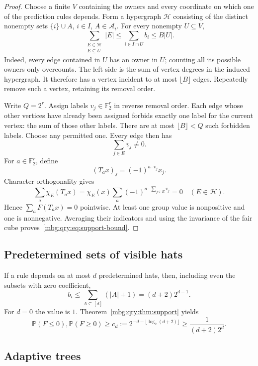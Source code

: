 \documentclass[11pt,letterpaper]{article}
\theoremstyle{definition}
\newcommand{\E}{\mathbb E}
\newcommand{\Prb}{\mathbb P}
\newcommand{\F}{\mathbb F}
\begin{document}
\begin{proof}
Choose a finite \(V\) containing the owners and every coordinate on
which one of the prediction rules depends. Form a
hypergraph \(\mathcal H\) consisting of the distinct nonempty sets
\(\{i\}\cup A\), \(i\in I\), \(A\in\mathcal A_i\).
For every nonempty \(U\subseteq V\),
\begin{equation}
 \sum_{\substack{E\in\mathcal H\\E\subseteq U}}|E|
 \le \sum_{i\in I\cap U}b_i\le B|U|.
 \label{mbg:qry:eq:incidence}
\end{equation}
Indeed, every edge contained in \(U\) has an owner in \(U\);
counting all its possible owners only overcounts.
The left side is the sum of vertex degrees in the induced hypergraph.
It therefore has a vertex incident to at most \(\lfloor B\rfloor\)
edges. Repeatedly remove such a vertex, retaining its removal order.

Write \(Q=2^r\). Assign labels \(v_j\in\F_2^r\) in reverse removal
order. Each edge whose other vertices have already been assigned
forbids exactly one label for the current vertex: the sum of those
other labels. There are at most \(\lfloor B\rfloor<Q\) such forbidden
labels. Choose any permitted one. Every edge then has
\[
 \sum_{j\in E}v_j\ne0.
\]
For \(a\in\F_2^r\), define
\[
 (T_ax)_j=(-1)^{a\cdot v_j}x_j.
\]
Character orthogonality gives
\[
 \sum_a\chi_E(T_ax)=
 \chi_E(x)\sum_a(-1)^{a\cdot\sum_{j\in E}v_j}=0
 \quad(E\in\mathcal H).
\]
Hence \(\sum_aF(T_ax)=0\) pointwise. At least one group value is
nonpositive and one is nonnegative. Averaging their indicators and
using the invariance of the fair cube proves~\eqref{mbg:qry:eq:support-bound}.
\end{proof}

\subsection{Predetermined sets of visible hats}

If a rule depends on at most \(d\) predetermined hats, then, including
even the subsets with zero coefficient,
\[
 b_i\le\sum_{A\subseteq[d]}(|A|+1)=(d+2)2^{d-1}.
\]
For \(d=0\) the value is \(1\). Theorem~\ref{mbg:qry:thm:support} yields
\begin{equation}
 \Prb(F\le0),\Prb(F\ge0)\ge
 c_d:=2^{-d-\lfloor\log_2(d+2)\rfloor}
 \ge\frac{1}{(d+2)2^d}.
 \label{mbg:qry:eq:nonadaptive}
\end{equation}

\subsection{Adaptive trees}
\end{document}
